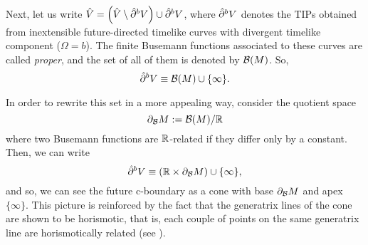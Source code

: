         Next, let us write $\hat{V}=\left(\hat{V}\setminus \hat{\partial}^{b}V\right) \cup \hat{\partial}^{{\color{black} b}}V$, where $\hat{\partial}^{{\color{black} b}}V$ denotes the TIPs obtained from inextensible future-directed timelike curves with divergent timelike component ($\Omega=b$). The finite Busemann functions associated to these curves are called {\em proper}, and the set of all of them is denoted by ${\cal B}(M)$. So,
        \[
\hat{\partial}^{{\color{black} b}}V\equiv {\cal B}(M)\cup \{\infty\}.
          \]


        In order to rewrite this set in a more appealing way, consider the quotient space
        \[
 \partial_{\cal B} M:={\cal B}(M)/{\mathbb R}
            \]
            where  two Busemann functions are ${\mathbb R}$-related if they differ only by a constant.
            Then, we can write
            \[
\hat{\partial}^{{\color{black} b}} V\equiv \left({\mathbb R}\times\partial_{\cal B} M \right)\cup \{\infty\},
              \]
              and so, we can see the future c-boundary as a cone with base $\partial_{\cal B} M$ and apex $\{\infty\}$. This picture is reinforced by the fact that the generatrix lines of the cone are shown to be horismotic, that is, each couple of points on the same generatrix line are horismotically related (see \cite[Section 3]{FHSIso2}).

